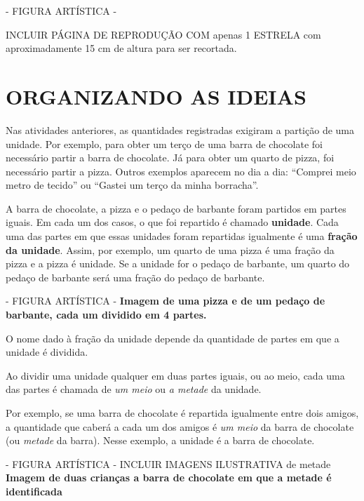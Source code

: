 \documentclass[a4,12pt]{book}
\begin{document}
\begin{imagem*}[breakable]{}{}   - FIGURA ARTÍSTICA -  
  \begin{nota*}[breakable]{}{}         
    INCLUIR PÁGINA DE REPRODUÇÃO COM apenas 1 ESTRELA com aproximadamente 15 cm de altura para ser recortada.    
  \end{nota*}  
\end{imagem*}

\section{ORGANIZANDO AS IDEIAS }

Nas atividades anteriores, as quantidades registradas exigiram a partição de uma unidade. Por exemplo, para obter um terço de uma barra de chocolate foi necessário partir a barra de chocolate. Já para obter um quarto de pizza, foi necessário partir a pizza. Outros exemplos aparecem no dia a dia: ``Comprei meio metro de tecido'' ou ``Gastei um terço da minha borracha''.

A barra de chocolate, a pizza e o pedaço de barbante foram partidos em partes iguais. 
Em cada um dos casos, o que foi repartido é chamado {\bf unidade}. Cada uma das partes em que essas unidades foram repartidas igualmente é uma {\bf fração da unidade}. Assim, por exemplo, um quarto de uma pizza é uma fração da pizza e a pizza é unidade. Se a unidade for o pedaço de barbante, um quarto do pedaço de barbante será uma fração do pedaço de barbante.

\begin{imagem*}[breakable]{}{}   - FIGURA ARTÍSTICA -  
  {\bf Imagem de uma pizza e de um pedaço de barbante, cada um dividido em 4 partes.}  
\end{imagem*}

O nome dado à fração da unidade depende da quantidade de partes em que a unidade é dividida. 

Ao dividir uma unidade qualquer em duas partes iguais, ou ao meio, cada uma das partes é chamada de {\it um meio} ou {\it a metade} da unidade. 

Por exemplo, se uma barra de chocolate é repartida igualmente entre dois amigos, a quantidade que caberá a cada um dos amigos é {\it um meio} da barra de chocolate (ou {\it metade} da barra). Nesse exemplo, a unidade é a barra de chocolate.

\begin{imagem*}[breakable]{}{}   - FIGURA ARTÍSTICA - INCLUIR IMAGENS ILUSTRATIVA de metade   
  {\bf Imagem de duas crianças a barra de chocolate em que a metade é identificada}  
\end{imagem*}
\end{document}
